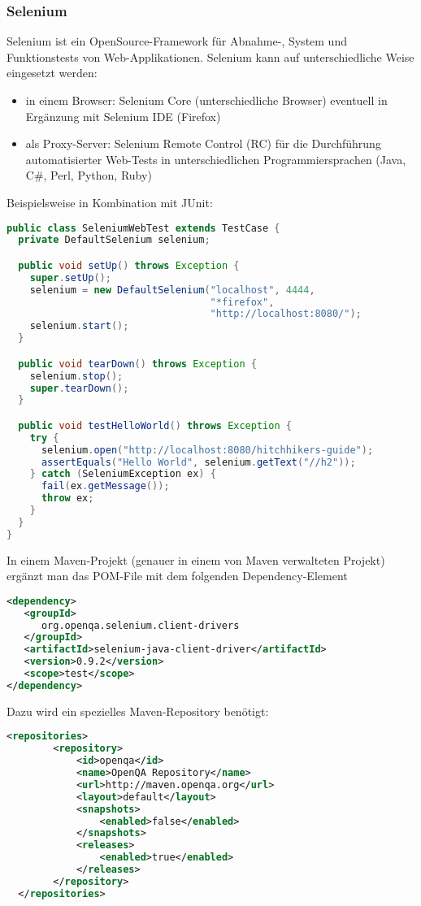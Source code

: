 \subsubsection{Selenium}
Selenium ist ein OpenSource-Framework für Abnahme-, System und
Funktionstests von Web-Applikationen. Selenium kann auf
unterschiedliche Weise eingesetzt werden:
\begin{itemize}
\item in einem Browser: Selenium Core (unterschiedliche Browser)
  eventuell in Ergänzung mit Selenium IDE (Firefox)
\item als Proxy-Server: Selenium Remote Control (RC) für die Durchführung
  automatisierter Web-Tests in unterschiedlichen Programmiersprachen
  (Java, C\#, Perl, Python, Ruby)
\end{itemize}
\newslide
Beispielsweise in Kombination mit JUnit:
\begin{lstlisting}[language=java]
public class SeleniumWebTest extends TestCase {
  private DefaultSelenium selenium;

  public void setUp() throws Exception {
    super.setUp();
    selenium = new DefaultSelenium("localhost", 4444,
                                   "*firefox",
                                   "http://localhost:8080/");
    selenium.start();
  }

  public void tearDown() throws Exception {
    selenium.stop();
    super.tearDown();
  }

  public void testHelloWorld() throws Exception {
    try {
      selenium.open("http://localhost:8080/hitchhikers-guide");
      assertEquals("Hello World", selenium.getText("//h2"));
    } catch (SeleniumException ex) {
      fail(ex.getMessage());
      throw ex;
    }
  }
}
\end{lstlisting}
\newslide
In einem Maven-Projekt (genauer in einem von Maven verwalteten Projekt)
ergänzt man das POM-File mit dem folgenden Dependency-Element
\begin{lstlisting}[language=xml,
  morekeywords={dependency,groupId,artifactId,version,scope,enabled}]
<dependency>
   <groupId>
      org.openqa.selenium.client-drivers
   </groupId>
   <artifactId>selenium-java-client-driver</artifactId>
   <version>0.9.2</version>
   <scope>test</scope>
</dependency>
\end{lstlisting}
\newslide
Dazu wird ein spezielles Maven-Repository benötigt:
\begin{lstlisting}[language=xml,
  morekeywords={repositories,repository,id,name,url,layout,snapshots,releases}]
 <repositories>
        <repository>
            <id>openqa</id>
            <name>OpenQA Repository</name>
            <url>http://maven.openqa.org</url>
            <layout>default</layout>
            <snapshots>
                <enabled>false</enabled>
            </snapshots>
            <releases>
                <enabled>true</enabled>
            </releases>
        </repository>
  </repositories>
\end{lstlisting}
